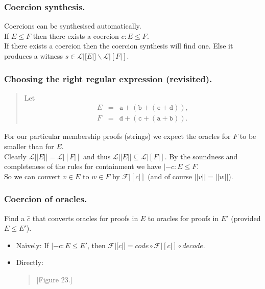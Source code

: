 \documentclass[slidestop,compress,mathserif, xcolor=table]{beamer}
\begin{document}
\begin{frame}
  \frametitle{Coercion synthesis.}
  Coercions can be synthesised automatically.\\[1em]

  If $E \leq F$ then there exists a coercion $c : E \leq F$.\\[1em]

  If there exists a coercion then the coercion synthesis will find one. Else it
  produces a witness $s \in \mathcal{L}|[E|] \backslash \mathcal{L}|[F|]$.

\end{frame}

\begin{frame}
  \frametitle{Choosing the right regular expression (revisited).}

  \begin{quote}
    Let
    \begin{eqnarray*}
      E &=& \mathtt{a} + (\mathtt{b} + (\mathtt{c} + \mathtt{d})),\\
      F &=& \mathtt{d} + (\mathtt{c} + (\mathtt{a} + \mathtt{b})).
    \end{eqnarray*}
  \end{quote}
  For our particular membership proofs (strings) we expect the oracles for $F$
  to be smaller than for $E$.\\[1em]

  Clearly $\mathcal{L}|[E|] = \mathcal{L}|[F|]$ and thus $\mathcal{L}|[E|]
  \subseteq \mathcal{L}|[F|]$. By the soundness and completeness of the rules
  for containment we have $|- c : E \leq F$.\\[1em]

  So we can convert $v \in E$ to $w \in F$ by $\mathcal{F}|[c|]$ (and of course
  $||v|| = ||w||$).
\end{frame}

\begin{frame}
  \frametitle{Coercion of oracles.}

  Find a $\hat{c}$ that converts oracles for proofs in $E$ to oracles for proofs
  in $E'$ (provided $E \leq E'$).

    \begin{itemize}
    \item Naïvely: If $|- c : E \leq E'$, then $\mathcal{F}|[\hat{c}|] =
      code \circ \mathcal{F}|[c|] \circ decode$.
    \item Directly:
      \begin{quote}
        [Figure 23.]
      \end{quote}
    \end{itemize}
\end{frame}
\end{document}

